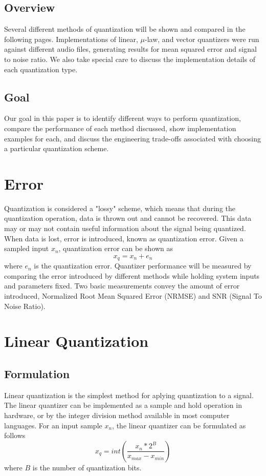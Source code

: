 \documentclass[journal]{IEEEtran}
\begin{document}
\subsection{Overview}
Several different methods of quantization will be shown and compared in the following pages. Implementations of linear, 
$\mu$-law, and vector quantizers were run against different audio files, generating results for mean squared error and 
signal to noise ratio. We also take special care to discuss the implementation details of each quantization type.

\subsection{Goal}
Our goal in this paper is to identify different ways to perform quantization, compare the performance of each method discussed, show 
implementation examples for each, and discuss the engineering trade-offs associated with choosing a particular quantization scheme.

\section{Error}
Quantization is considered a "lossy" scheme, which means that during the quantization operation, data is thrown out and cannot
be recovered. This data may or may not contain useful information about the signal being quantized. When data is lost, error is
introduced, known as quantization error. Given a sampled input $x_n$, quantization error can be shown as \cite{DSPBook}
\begin{equation}
    x_q = x_n + e_n
\end{equation}
where $e_n$ is the quantization error. Quantizer performance will be measured by comparing the error introduced by different methods
while holding system inputs and parameters fixed. Two basic measurements convey the amount of error introduced, Normalized Root Mean Squared Error (NRMSE)
and SNR (Signal To Noise Ratio).

\section{Linear Quantization}
\subsection{Formulation}
Linear quantization is the simplest method for aplying quantization to a signal. The linear quantizer can be implemented as a sample
and hold operation in hardware, or by the integer division method available in most computer languages. For an input sample $x_n$, the
linear quantizer can be formulated as follows \cite{DSPBook}
\begin{equation}
    x_q = int(\frac{x_n*2^B}{x_{max} - x_{min}}) 
    \label{eq:linear}
\end{equation}
where $B$ is the number of quantization bits.
\end{document}
